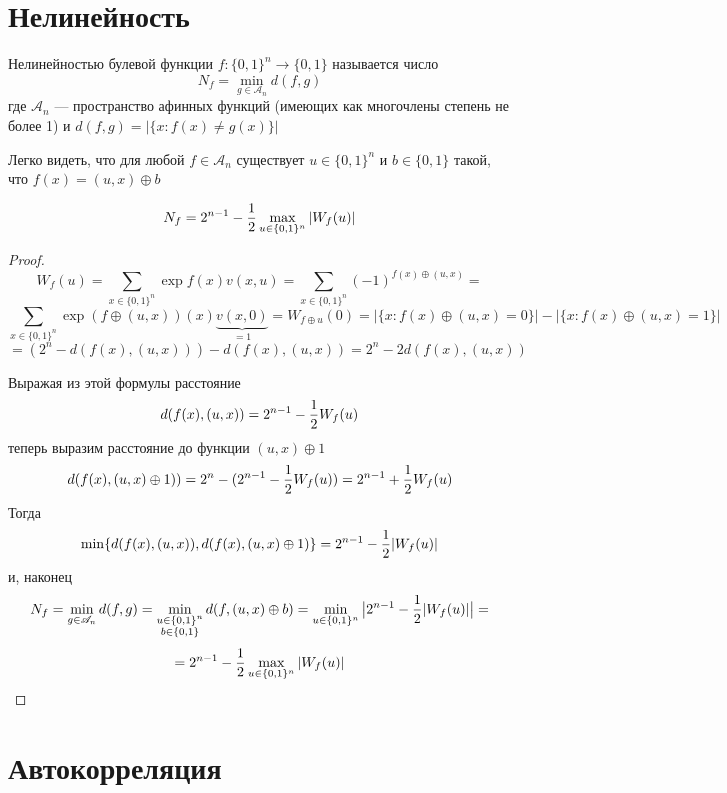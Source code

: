 
\section{Нелинейность}
\begin{definition}
Нелинейностью булевой функции $f: \{0,1\}^n \to \{0,1\}$ называется число
   $$N_f = \min\limits_{g \in \mathscr{A}_n} d(f,g)$$
 где $\mathscr{A}_n$ --- пространство афинных функций (имеющих как многочлены степень не более 1) и
  $d(f,g) = |\{x \colon f(x) \neq g(x)\}|$
\end{definition}

\begin{note}
Легко видеть, что для любой $f \in \mathscr{A}_n$ существует $u \in \{0,1\}^n$ и 
$b \in \{0,1\}$ такой, что $f(x) = (u,x) \oplus b$
\end{note}

\begin{theorem}
$$N_f = 2^{n-1} - {1 \over 2} \max\limits_{u \in \{0,1\}^n} |W_f(u)|$$
\end{theorem}
\begin{proof}
\[
W_f(u) = \sum\limits_{x \in \{0,1\}^n} \exp f(x) v(x,u) = 
\sum\limits_{x \in \{0,1\}^n} (-1)^{f(x) \oplus (u,x)} = 
\]
\[
\sum\limits_{x \in \{0,1\}^n} \exp (f\oplus (u,x))(x) \underbrace{v(x,0)}_{=1} = W_{f \oplus u} (0)
= |\{x \colon f(x)\oplus (u,x) = 0\}| - |\{x \colon f(x)\oplus (u,x) = 1\}| 
\]
\[
=  (2^n - d(f(x), (u,x))) - d(f(x), (u,x)) = 2^n - 2 d(f(x), (u,x))
\]

Выражая из этой формулы расстояние 
$$ d(f(x), (u,x)) = 2^{n-1} - {1 \over 2} W_f(u)$$
теперь выразим расстояние до функции $(u,x) \oplus 1$
$$d(f(x), (u,x) \oplus 1)) = 2^n - (2^{n-1} - {1 \over 2} W_f(u)) = 2^{n-1} + {1 \over 2} W_f(u)$$
Тогда 
$$\min \{d(f(x), (u,x)), d(f(x), (u,x) \oplus 1)\} = 2^{n-1} - {1 \over 2} |W_f(u)|$$
и, наконец 
$$N_f = \min\limits_{g \in \mathscr{A}_n} d(f,g)
 = \min\limits_{\substack{u \in \{0,1\}^n \\ b \in \{0,1\}}} d(f,(u,x)\oplus b) = 
 \min\limits_{u \in \{0,1\}^n} \big|2^{n-1} - {1 \over 2} |W_f(u)|\big| =$$
 $$ = 2^{n-1} - {1 \over 2} \max\limits_{u \in \{0,1\}^n} |W_f(u)|$$
\end{proof}

\section{Автокорреляция}

